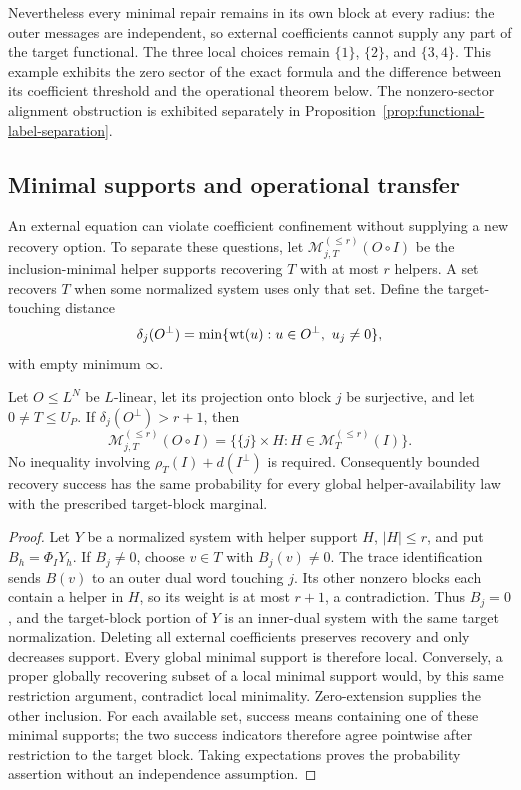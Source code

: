 Nevertheless every minimal repair remains in its own block at every radius:
the outer messages are independent, so external coefficients cannot supply
any part of the target functional.  The three local choices remain
$\{1\}$, $\{2\}$, and $\{3,4\}$.  This example exhibits the zero sector
of the exact formula and the difference between its coefficient threshold
and the operational theorem below.  The nonzero-sector alignment obstruction
is exhibited separately in Proposition~\ref{prop:functional-label-separation}.

\subsection{Minimal supports and operational transfer}

An external equation can violate coefficient confinement without supplying a
new recovery option.  To separate these questions, let
$\mathcal M_{j,T}^{(\leq r)}(O\circ I)$ be the inclusion-minimal helper
supports recovering $T$ with at most $r$ helpers.  A set recovers $T$ when
some normalized system uses only that set.  Define the target-touching distance
\[
 \delta_j(O^\perp)=\min\{\wt(u):u\in O^\perp,\ u_j\ne0\},
\]
with empty minimum $\infty$.

\begin{theorem}
\label{thm:minimal-support-confinement}
%
Let $O\leq L^N$ be $L$-linear, let its projection onto block $j$ be
surjective, and let $0\ne T\leq U_P$.  If $\delta_j(O^\perp)>r+1$, then
\[
 \mathcal M_{j,T}^{(\leq r)}(O\circ I)
 =\{\{j\}\times H:H\in\mathcal M_T^{(\leq r)}(I)\}.
\]
No inequality involving $\rho_T(I)+d(I^\perp)$ is required.
Consequently bounded recovery success has the same probability for every
global helper-availability law with the prescribed target-block marginal.
\end{theorem}

\begin{proof}
Let $Y$ be a normalized system with helper support $H$, $|H|\leq r$, and
put $B_h=\Phi_IY_h$.  If $B_j\ne0$, choose $v\in T$ with $B_j(v)\ne0$.
The trace identification sends $B(v)$ to an outer dual word touching $j$.
Its other nonzero blocks each contain a helper in $H$, so its weight is at
most $r+1$, a contradiction.  Thus $B_j=0$, and the target-block portion
of $Y$ is an inner-dual system with the same target normalization.  Deleting
all external coefficients preserves recovery and only decreases support.
Every global minimal support is therefore local.  Conversely, a proper
globally recovering subset of a local minimal support would, by this same
restriction argument, contradict local minimality.  Zero-extension supplies
the other inclusion.  For each available set, success means containing one
of these minimal supports; the two success indicators therefore agree
pointwise after restriction to the target block.  Taking expectations proves
the probability assertion without an independence assumption.
%
\end{proof}


